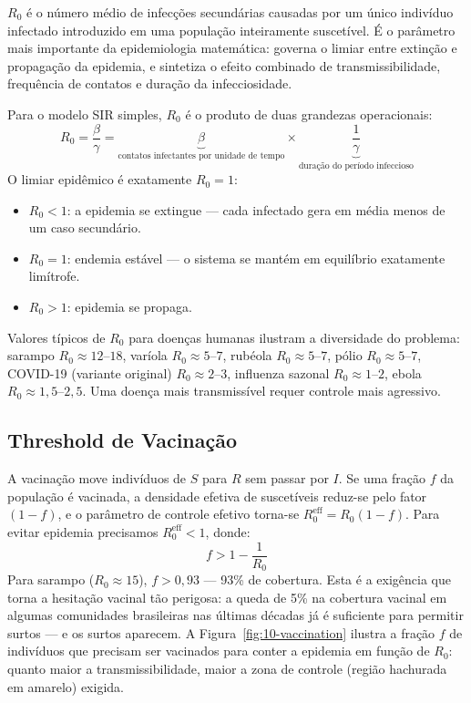 \begin{definicaoenv}
$R_0$ é o número médio de infecções secundárias causadas por um único
indivíduo infectado introduzido em uma população inteiramente suscetível.
É o parâmetro mais importante da epidemiologia matemática: governa o limiar
entre extinção e propagação da epidemia, e sintetiza o efeito combinado de
transmissibilidade, frequência de contatos e duração da infecciosidade.
\end{definicaoenv}

Para o modelo SIR simples, $R_0$ é o produto de duas grandezas operacionais:
\begin{equation}
R_0 = \frac{\beta}{\gamma} = \underbrace{\beta}_{\text{contatos infectantes
por unidade de tempo}} \times \underbrace{\frac{1}{\gamma}}_{\text{duração do
período infeccioso}}
\end{equation}
O limiar epidêmico é exatamente $R_0 = 1$:
\begin{itemize}
\item $R_0 < 1$: a epidemia se extingue --- cada infectado gera em média
  menos de um caso secundário.
\item $R_0 = 1$: endemia estável --- o sistema se mantém em equilíbrio
  exatamente limítrofe.
\item $R_0 > 1$: epidemia se propaga.
\end{itemize}

Valores típicos de $R_0$ para doenças humanas ilustram a diversidade do
problema: sarampo $R_0 \approx 12$--$18$, varíola $R_0 \approx 5$--$7$,
rubéola $R_0 \approx 5$--$7$, pólio $R_0 \approx 5$--$7$, COVID-19 (variante
original) $R_0 \approx 2$--$3$, influenza sazonal $R_0 \approx 1$--$2$,
ebola $R_0 \approx 1{,}5$--$2{,}5$. Uma doença mais transmissível requer
controle mais agressivo.

\subsection{Threshold de Vacinação}
\label{sub:image10-vaccination}

A vacinação move indivíduos de $S$ para $R$ sem passar por $I$. Se uma fração
$f$ da população é vacinada, a densidade efetiva de suscetíveis reduz-se pelo
fator $(1 - f)$, e o parâmetro de controle efetivo torna-se
$R_0^{\mathrm{eff}} = R_0(1 - f)$. Para evitar epidemia precisamos
$R_0^{\mathrm{eff}} < 1$, donde:
\begin{equation}
f > 1 - \frac{1}{R_0}
\end{equation}
Para sarampo ($R_0 \approx 15$), $f > 0{,}93$ --- 93\% de cobertura. Esta é a
exigência que torna a hesitação vacinal tão perigosa: a queda de 5\% na
cobertura vacinal em algumas comunidades brasileiras nas últimas décadas já é
suficiente para permitir surtos --- e os surtos aparecem. A
Figura~\ref{fig:10-vaccination} ilustra a fração $f$ de indivíduos que
precisam ser vacinados para conter a epidemia em função de $R_0$: quanto
maior a transmissibilidade, maior a zona de controle (região hachurada em
amarelo) exigida.

